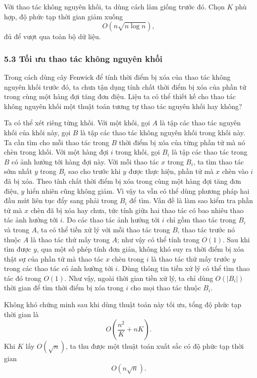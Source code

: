 \documentclass[11pt]{article}
\begin{document}
Với thao tác không nguyên khối, ta dùng cách làm giống trước đó. Chọn \(K\) phù
hợp, độ phức tạp thời gian giảm xuống
\[
  O(n\sqrt{n\log n}),
\]
đủ để vượt qua toàn bộ dữ liệu.

\subsubsection*{5.3 Tối ưu thao tác không nguyên khối}

Trong cách dùng cây Fenwick để tính thời điểm bị xóa của thao tác không nguyên
khối trước đó, ta chưa tận dụng tính chất thời điểm bị xóa của phần tử trong
cùng một hàng đợi tăng đơn điệu. Liệu ta có thể thiết kế cho thao tác không
nguyên khối một thuật toán tương tự thao tác nguyên khối hay không?

Ta có thể xét riêng từng khối. Với một khối, gọi \(A\) là tập các thao tác
nguyên khối của khối này, gọi \(B\) là tập các thao tác không nguyên khối trong
khối này. Ta cần tìm cho mỗi thao tác trong \(B\) thời điểm bị xóa của từng phần
tử mà nó chèn trong khối. Với một hàng đợi \(i\) trong khối, gọi \(B_i\) là tập
các thao tác trong \(B\) có ảnh hưởng tới hàng đợi này. Với mỗi thao tác \(x\)
trong \(B_i\), ta tìm thao tác sớm nhất \(y\) trong \(B_i\) sao cho trước khi
\(y\) được thực hiện, phần tử mà \(x\) chèn vào \(i\) đã bị xóa. Theo tính chất
thời điểm bị xóa trong cùng một hàng đợi tăng đơn điệu, \(y\) hiển nhiên cũng
không giảm. Vì vậy ta vẫn có thể dùng phương pháp hai đầu mút liên tục đẩy sang
phải trong \(B_i\) để tìm. Vấn đề là làm sao kiểm tra phần tử mà \(x\) chèn đã
bị xóa hay chưa, tức tính giữa hai thao tác có bao nhiêu thao tác ảnh hưởng tới
\(i\). Do các thao tác ảnh hưởng tới \(i\) chỉ gồm thao tác trong \(B_i\) và
trong \(A\), ta có thể tiền xử lý với mỗi thao tác trong \(B\), thao tác trước
nó thuộc \(A\) là thao tác thứ mấy trong \(A\); như vậy có thể tính trong
\(O(1)\). Sau khi tìm được \(y\), qua một số phép tính đơn giản, không khó suy
ra thời điểm bị xóa thật sự của phần tử mà thao tác \(x\) chèn trong \(i\) là
thao tác thứ mấy trước \(y\) trong các thao tác có ảnh hưởng tới \(i\). Dùng
thông tin tiền xử lý có thể tìm thao tác đó trong \(O(1)\). Như vậy, ngoài thời
gian tiền xử lý, ta chỉ dùng \(O(|B_i|)\) thời gian để tìm thời điểm bị xóa
trong \(i\) cho mọi thao tác thuộc \(B_i\).

Không khó chứng minh sau khi dùng thuật toán này tối ưu, tổng độ phức tạp thời
gian là
\[
  O\left(\frac{n^2}{K}+nK\right).
\]
Khi \(K\) lấy \(O(\sqrt n)\), ta thu được một thuật toán xuất sắc có độ phức tạp
thời gian
\[
  O(n\sqrt n).
\]
\end{document}
